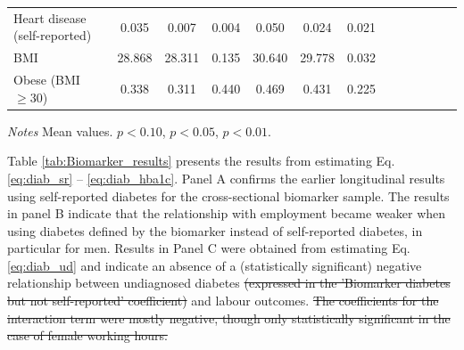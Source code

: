 \documentclass[12pt,english]{article}
\providecommand{\DIFaddtex}[1]{{\protect\color{blue}\uwave{#1}}} %
\providecommand{\DIFdeltex}[1]{{\protect\color{red}\sout{#1}}}                      %
\providecommand{\DIFdelbegin}{} %
\providecommand{\DIFdelend}{} %
\providecommand{\DIFaddFL}[1]{\DIFadd{#1}} %
\providecommand{\DIFaddbeginFL}{} %
\providecommand{\DIFaddendFL}{} %
\providecommand{\DIFadd}[1]{\texorpdfstring{\DIFaddtex{#1}}{#1}} %
\providecommand{\DIFdel}[1]{\texorpdfstring{\DIFdeltex{#1}}{}} %
\begin{document}
\begin{table}[!ht]
\begin{center}
\begin{adjustbox}{max width=\linewidth}
\begin{threeparttable}
{\begin{tabular}{l*{6}{S S}}
						Heart disease (self-reported)      &       0.035&       0.007&       0.004&       0.050&       0.024&       0.021\\
						BMI     &      28.868&      28.311&       0.135&      30.640&      29.778&       0.032\\
						Obese (BMI $\geq 30$)&       0.338&       0.311&       0.440&       0.469&       0.431&       0.225\\
						\bottomrule
					\end{tabular}\DIFaddbeginFL \DIFaddFL{were
					}\DIFaddendFL \begin{tablenotes}
						\item \footnotesize \textit{Notes} Mean values. \sym{*} \(p<0.10\), \sym{**} \(p<0.05\), \sym{***} \(p<0.01\).
					\end{tablenotes}
				}
			\end{threeparttable}
		\end{adjustbox}
	\end{center}
\end{table}


Table \ref{tab:Biomarker_results} presents the results from estimating Eq. \ref{eq:diab_sr} -- \ref{eq:diab_hba1c}. Panel A confirms the earlier longitudinal results using self-reported diabetes for the cross-sectional biomarker sample. The results in panel B indicate that the relationship with employment became weaker when using diabetes defined by the biomarker instead of self-reported diabetes, in particular for men. Results in Panel C were obtained from estimating Eq. \ref{eq:diab_ud} and indicate an absence of a (statistically significant) negative relationship between undiagnosed diabetes \DIFdelbegin \DIFdel{(expressed in the 'Biomarker diabetes but not self-reported' coefficient) }\DIFdelend and labour outcomes. 
\DIFdelbegin \DIFdel{The coefficients for the interaction term were mostly negative, though only statistically significant in the case of female working hours. 
}\DIFdelend 
\end{document}

